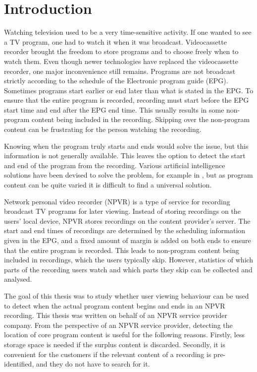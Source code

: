 \section{Introduction} \label{sec:intro}

Watching television used to be a very time-sensitive activity. If one wanted to see a TV program, one had to watch it when it was broadcast. Videocassette recorder brought the freedom to store programs and to choose freely when to watch them. Even though newer technologies have replaced the videocassette recorder, one major inconvenience still remains. Programs are not broadcast strictly according to the schedule of the Electronic program guide (EPG). Sometimes programs start earlier or end later than what is stated in the EPG. To ensure that the entire program is recorded, recording must start before the EPG start time and end after the EPG end time. This usually results in some non-program content being included in the recording. Skipping over the non-program content can be frustrating for the person watching the recording.

Knowing when the program truly starts and ends would solve the issue, but this information is not generally available. This leaves the option to detect the start and end of the program from the recording. Various artificial intelligence solutions have been devised to solve the problem, for example in \cite{berraniNonsupervisedApproachRepeated2008} \cite{ibrahimTVStreamStructuring2011} \cite{kompatsiarisTVContentAnalysis2012} \cite{mansonAutomaticTVBroadcast2010}, but as program content can be quite varied it is difficult to find a universal solution.

Network personal video recorder (NPVR) is a type of service for recording broadcast TV programs for later viewing. Instead of storing recordings on the users' local device, NPVR stores recordings on the content provider's server. The start and end times of recordings are determined by the scheduling information given in the EPG, and a fixed amount of margin is added on both ends to ensure that the entire program is recorded. This leads to non-program content being included in recordings, which the users typically skip. However, statistics of which parts of the recording users watch and which parts they skip can be collected and analysed. 

The goal of this thesis was to study whether user viewing behaviour can be used to detect when the actual program content begins and ends in an NPVR recording. This thesis was written on behalf of an NPVR service provider company. From the perspective of an NPVR service provider, detecting the location of core program content is useful for the following reasons. Firstly, less storage space is needed if the surplus content is discarded. Secondly, it is convenient for the customers if the relevant content of a recording is pre-identified, and they do not have to search for it. %

